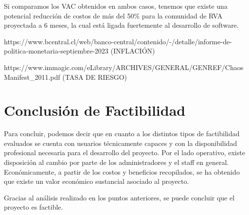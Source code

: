 Si comparamos los VAC obtenidos en ambos casos, tenemos que existe una potencial reducción de costos de más del 50\% para la comunidad de RVA proyectada a 6 meses, la cual está ligada fuertemente al desarrollo de software.

https://www.bcentral.cl/web/banco-central/contenido/-/detalle/informe-de-politica-monetaria-septiembre-2023 (INFLACIÓN)

https://www.immagic.com/eLibrary/ARCHIVES/GENERAL/GENREF/ChaosManifest\_2011.pdf (TASA DE RIESGO)

\section{Conclusión de Factibilidad}
Para concluir, podemos decir que en cuanto a los distintos tipos de factibilidad evaluados se cuenta con usuarios técnicamente capaces y con la disponibilidad profesional necesaria para el desarrollo del proyecto. Por el lado operativo, existe disposición al cambio por parte de los administradores y el staff en general. Económicamente, a partir de los costos y beneficios recopilados, se ha obtenido que existe un valor económico sustancial asociado al proyecto.

Gracias al análisis realizado en los puntos anteriores, se puede concluir que el proyecto es factible.
